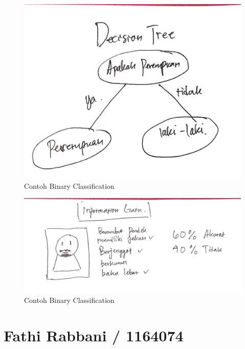\begin{figure}[ht]
      \centerline{\includegraphics[width=1\textwidth]
      {figures/c17}}
      \caption{Contoh Binary Classification}
      \label{c17}
      \end{figure}

\begin{figure}[ht]
      \centerline{\includegraphics[width=1\textwidth]
      {figures/c18}}
      \caption{Contoh Binary Classification}
      \label{c18}
      \end{figure}

\section{Fathi Rabbani / 1164074}
